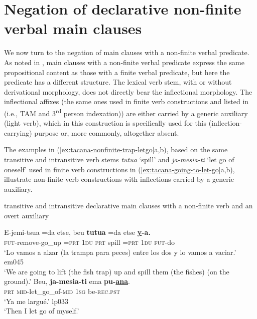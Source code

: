 \documentclass[output=paper]{langsci/langscibook}
\begin{document}
\section{Negation of declarative non-finite verbal main clauses}\label{sec:tacana-6}

We now turn to the negation of main clauses with a non-finite verbal
predicate. As noted in , main clauses with a
non-finite verbal predicate express the same propositional content as those
with a finite verbal predicate, but here the predicate has a different
structure. The lexical verb stem, with or without derivational morphology,
does not directly bear the inflectional morphology. The inflectional
affixes (the same ones used in finite verb constructions and listed in
 (i.e., TAM and 3\textsuperscript{rd}
person indexation)) are
either carried by a generic auxiliary (light verb), which in this
construction is specifically used for this (inflection-carrying) purpose
or, more commonly, altogether absent.

The examples in (\ref{ex:tacana-nonfinite-trap-letgo}a,b), based on the
same transitive and intransitive verb stems \textit{tutua} `spill' and
\textit{ja-mesia-ti} `let go of oneself' used in finite verb constructions
in (\ref{ex:tacana-going-to-let-go}a,b), illustrate non-finite verb
constructions with inflections carried by a generic auxiliary.

\begin{exe}\ex \label{ex:tacana-nonfinite-trap-letgo}  transitive and
intransitive declarative main clauses with a non-finite verb and an overt
auxiliary 
\begin{xlist}
\ex\label{ex:tacana-nonfinite-trap}
\gll   E-jemi-tsua   =da  etse,  beu
\textbf{tutua} =da
etse \textbf{\underline{y}-a.}\\
    \textsc{fut}-remove-go\_up  \textsc{=prt}  \textsc{1du} 
    \textsc{prt}  spill  =\textsc{prt}  \textsc{1du}  \textsc{fut-}do\\
\glt `Lo vamos a alzar (la trampa para peces) entre los dos y
lo vamos a vaciar.' em045\\
`We are going to lift (the fish trap) up and spill them (the fishes)
(on the ground).'
\ex\label{ex:tacana-nonfinite-letgo}
\gll  Beu,
\textbf{ja-mesia-ti}
ema \textbf{pu-\underline{ana}}.\\
    \textsc{prt}  \textsc{mid-}let\_go\_of-\textsc{mid}  \textsc{1sg}
    be\textsc{-rec.pst}\\
\glt `Ya me largué.' lp033\\
`Then I let go of myself.'
\end{xlist}\end{exe}
\end{document}
